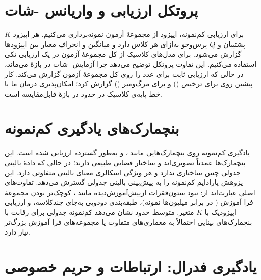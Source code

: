 \section{پروتکل ارزیابی و واریانس -شات}

برای ارزیابی کم‌نمونه،  اپیزود از مجموعۀ آزمون نمونه‌برداری می‌کنیم. هر اپیزود $K$ پشتیبان و $Q$ پرس‌وجو به‌ازای هر کلاس دارد و میانگین  و انحراف معیار بین اپیزودها گزارش می‌شود. برای مدل‌های کلاسیک از کل مجموعۀ آزمون در یک ارزیابی تکی استفاده می‌کنیم. این تفاوت پروتکل توضیح می‌دهد چرا  آزمایش -شات در بازۀ  می‌ماند، در حالی که ارزیابی ثابت  برای \texttt{} عدد  را روی کل مجموعۀ آزمون گزارش می‌کند. کار پیشین روی    برای ترخیص () و  برای مرگ‌ومیر () گزارش کرد؛  امکان‌پذیری درمان  ما با خط پایه‌ی کلاسیک در حدود  در بازۀ قابل‌مقایسه است.

\section{بنچمارک‌های یادگیری کم‌نمونه}

یادگیری کم‌نمونه روی بنچمارک‌هایی مانند ،  و  به‌طور گسترده ارزیابی شده است. این بنچمارک‌ها عمدتاً تصویری‌اند و ساختار فضایی طبیعی دارند؛ در حالی که دادۀ بالینی جدولی چنین ساختاری ندارد و هر ویژگی اسکالری معنای بالینی متفاوتی دارد. این پژوهش پارادایم کم‌نمونه را به پیش‌بینی بالینی جدولی گسترش می‌دهد. تفاوت‌های اصلی عبارت‌اند از: نبود ستون‌فقرات ازپیش‌آموزش‌دیده مانند ، کوچک‌تر بودن مجموعۀ فرا-آموزش ( در برابر میلیون‌ها نمونه)، طبقه‌بندی دودویی به‌جای چندکلاسه، و ارزیابی اپیزودیک با $K$ متغیر.  متوسط حدود  نشان می‌دهد کم‌نمونه جدولی برای رقابت با بنچمارک‌های بینایی احتمالاً به معماری‌های متفاوت یا مجموعه‌های فرا-آموزش بزرگ‌تر نیاز دارد.

\section{یادگیری فدرال: ارتباطات و حریم خصوصی}

